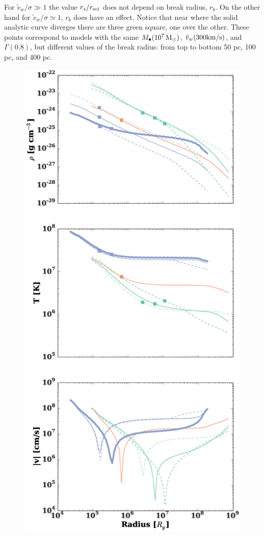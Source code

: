 \documentclass[usenatbib,fleqn]{mn2e}
\newcommand{\rs}{r_s}
\newcommand{\rb}{r_b}
\newcommand{\vw}{\tilde{v}_{w}}
\newcommand{\Mbh}[1][]{M_{\bullet#1}}
\newcommand{\soi}{\rm soi}
\newcommand{\rsoi}{r_{\soi}}
\begin{document}
For $\vw/\sigma \gg 1$ the value $\rs/\rsoi$ does not depend on break
radius, $r_b$. On the other hand for $\vw/\sigma \simeq 1$, $\rb$ does
have an effect. Notice that near where the solid analytic curve
diverges there are three green square, one over the other. These
points correspond to models with the same $\Mbh (10^7 \Msun)$, $\vw
(300 {\rm km/s})$, and $\Gamma (0.8)$, but different values of the
break radius: from top to bottom 50 pc, 100 pc, and 400 pc.  

\begin{figure}
  \includegraphics[width=\columnwidth]{profiles.eps}

\end{figure}
\end{document}
